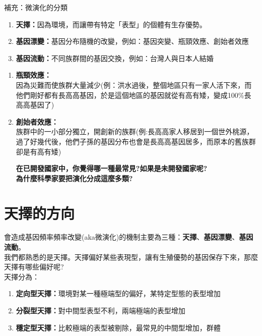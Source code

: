 補充：微演化的分類
\begin{enumerate}
\item \textbf{天擇：}因為環境，而讓帶有特定「表型」的個體有生存優勢。
\item \textbf{基因漂變：}基因分布隨機的改變，例如：基因突變、瓶頸效應、創始者效應
\item \textbf{基因流動：}不同族群間的基因交換，例如：台灣人與日本人結婚
\end{enumerate}
\begin{enumerate}
\item \textbf{瓶頸效應：}\\
因為災難而使族群大量減少(例：洪水過後，整個地區只有一家人活下來，而他們剛好都有長高高基因，於是這個地區的基因就從有高有矮，變成100\%長高高基因了)
\item \textbf{創始者效應：}\\
族群中的一小部分獨立，開創新的族群(例:長高高家人移居到一個世外桃源，過了好幾代後，他們子孫的基因分布也會是長高高基因居多，而原本的舊族群卻是有高有矮)

\textbf{在已開發國家中，你覺得哪一種最常見?如果是未開發國家呢?}\\
\textbf{為什麼科學家要把演化分成這麼多類?}

\end{enumerate}

\section{天擇的方向}
會造成基因頻率頻率改變(aka微演化)的機制主要為三種：\textbf{天擇}、\textbf{基因漂變}、\textbf{基因流動}。 \\
我們都熟悉的是天擇。天擇偏好某些表現型，讓有生殖優勢的基因保存下來，那麼天擇有哪些偏好呢? \\
天擇分為：
\begin{enumerate}[label=(\alph*)]
\item \textbf{定向型天擇：}環境對某一種極端型的偏好，某特定型態的表型增加
\item \textbf{分裂型天擇：}對中間型表型不利，兩端極端的表型增加
\item \textbf{穩定型天擇：}比較極端的表型被剔除，最常見的中間型增加，群體\underline{\hspace{8em}}
\end{enumerate}


